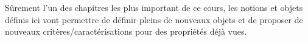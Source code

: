 
\minitoc  %

Sûrement l'un des chapitres les plus important de ce cours, les notions et objets définis ici vont permettre de 
définir pleins de nouveaux objets et de proposer de nouveaux critères/caractérisations pour des propriétés déjà vues. 

% 